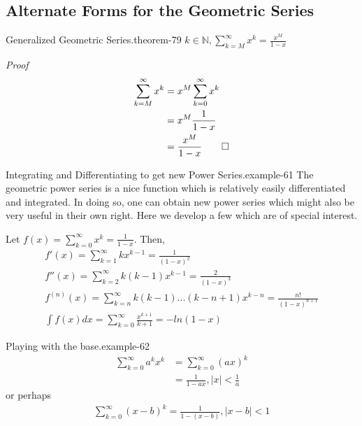 \documentclass[10pt,]{book}
\makeatletter
\renewcommand*{\proofname}{Proof}
\renewenvironment{proof}[1][\proofname]{\par
  \pushQED{\qed}%
  \normalfont \topsep6\p@\@plus6\p@\relax
  \trivlist
  \item\relax
    {\itshape
    #1\@addpunct{.}}\hspace\labelsep\ignorespaces
}{%
  \popQED\endtrivlist\@endpefalse
}
\numberwithin{equation}{section}
\newcommand{\lt}{<}
\makeatother
\begin{document}
\subsection[{Alternate Forms for the Geometric Series}]{Alternate Forms for the Geometric Series}\label{subsection-8}
\begin{theorem}{Generalized Geometric Series.}{}{theorem-79}%
\(k \in \mathbb{N}, \sum_{k=M}^{\infty} {x^k} = \frac{x^M}{1-x}\)\end{theorem}
\begin{proof}\hypertarget{proof-78}{}
%
\begin{align*}
\sum_{k=M}^{\infty} {x^k} & = x^M \sum_{k=0}^{\infty} {x^k}\\
& = x^M \frac{1}{1-x}\\
& = \frac{x^M}{1-x}\qedhere
\end{align*}
\end{proof}
\begin{example}{Integrating and Differentiating to get new Power Series.}{example-61}%
\hypertarget{p-1539}{}%
The geometric power series is a nice function which is relatively easily differentiated and integrated. In doing so, one can obtain new power series which might also be very useful in their own right.  Here we develop a few which are of special interest.%
\par
\hypertarget{p-1540}{}%
Let \(f(x) = \sum_{k=0}^\infty x^k = \frac{1}{1-x}\).  Then,%
%
\begin{gather*}
f'(x) = \sum_{k=1}^{\infty} {kx^{k-1}} = \frac{1}{(1-x)^2}\\
f''(x) = \sum_{k=2}^{\infty} {k(k-1)x^{k-1}} = \frac{2}{(1-x)^3}\\
f^{(n)}(x) = \sum_{k=n}^{\infty} {k(k-1)...(k-n+1)x^{k-n}} = \frac{n!}{(1-x)^{n+1}}\\
\int f(x) dx = \sum_{k=0}^{\infty} {\frac{x^{k+1}}{k+1}} = -ln(1-x)
\end{gather*}
\end{example}
\begin{example}{Playing with the base.}{example-62}%
%
\begin{align*}
\sum_{k=0}^{\infty} {a^k x^k} & = \sum_{k=0}^{\infty} {(ax)^k}\\
& = \frac{1}{1-ax}, |x| \lt \frac{1}{a}
\end{align*}
\hypertarget{p-1541}{}%
or perhaps%
%
\begin{gather*}
\sum_{k=0}^{\infty} {(x-b)^k} = \frac{1}{1-(x-b)}, |x-b| \lt 1
\end{gather*}
\end{example}
\end{document}
